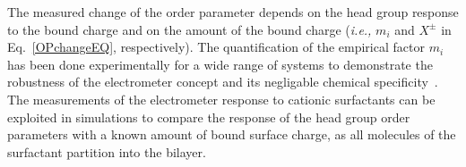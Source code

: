 The measured change of the order parameter depends on the head group response to the bound charge 
and on the amount of the bound charge (\textit{i.e.,} $m_i$ and $X^\pm$ in Eq.~\ref{OPchangeEQ}, respectively).  
The quantification of the empirical factor $m_i$ has been done experimentally for a wide range of systems
to demonstrate the robustness of the electrometer concept and its negligable chemical specificity~\citep{seelig87, beschiasvili91}. 
The measurements of the electrometer response to cationic surfactants 
can be exploited in simulations to compare the response of the head group order parameters 
with a known amount of bound surface charge,
as all molecules of the surfactant partition into the bilayer. 


